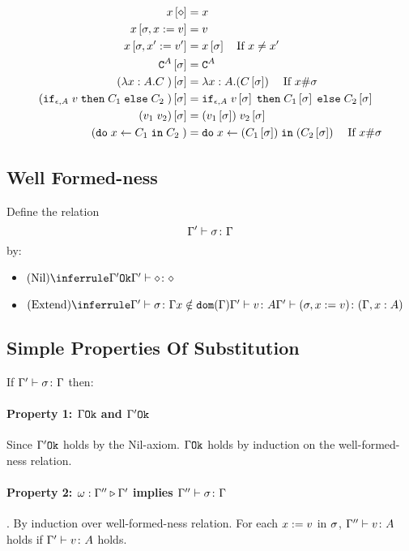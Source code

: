 {        
        \begin{align}
            x\left[\diamond\right] & = x \\
            x\left[\sigma,x:= v\right] & = v \\
            x\left[\sigma,x':= v'\right] & = x\left[\sigma\right]\quad\text{If }x \neq x'\\
            \texttt{C}^{A}\left[\sigma\right] & = \texttt{C}^{A} \\
            (\lambda x : A. C\;)\left[\sigma\right] &= \lambda x : A. (C\left[\sigma\right])\;\quad\text{If }x\#\sigma\\
            (\texttt{if}_{\epsilon, A}\; v\; \texttt{then}\; C_1 \;\texttt{else} \; C_2\;)\left[\sigma\right] &= \texttt{if}_{\epsilon, A}\; v\left[\sigma\right]\; \texttt{then}\; C_1\left[\sigma\right] \;\texttt{else} \; C_2\left[\sigma\right]\;\\
            (v_1\; v_2)\left[\sigma\right]&= (v_1\left[\sigma\right])\; v_2\left[\sigma\right]\\
            (\texttt{do}\; x \leftarrow C_1 \;\texttt{in}\; C_2\;)&= \texttt{do}\; x \leftarrow (C_1\left[\sigma\right]) \;\texttt{in}\; (C_2\left[\sigma\right])\;\quad\text{If } x\#\sigma\\
        \end{align}
    \subsection{Well Formed-ness}
    Define the relation $$\Gamma' \vdash \sigma \colon \Gamma$$ by:

    \begin{itemize}
        \item $\ntreeruleI{Nil}{\ok{\G'}}{\typerelation{\G'}{\nil}{\nil}}$
        \item $\ntreeruleIII{Extend}{
            \typerelation{\G'}{\si}{\G}
            }{
            x\notin\dom{\G}
            }{
            \typerelation{\G'}{v}{A}
        }{
            \typerelation{\G'}{(\si, x \setto v)}{(\gax)}
        }$
    \end{itemize}
    \subsection{Simple Properties Of Substitution}
    If $\Gamma' \vdash \sigma \colon \Gamma$ then:

        \paragraph{Property 1: $\Gamma \texttt{Ok}$ and $\Gamma' \texttt{Ok}$}
         Since $\Gamma' \texttt{Ok}$ holds by the Nil-axiom. $\Gamma \texttt{Ok}$ holds by induction on the well-formed-ness relation.
        \paragraph{Property 2: $\omega : \Gamma'' \triangleright \Gamma'$ implies $\Gamma'' \vdash \sigma \colon \Gamma$}. 
        By induction over well-formed-ness relation. For each $x:= v$ in $\sigma$, $\Gamma'' \vdash v \colon A$ holds if $\Gamma' \vdash v \colon A$ holds.
}
